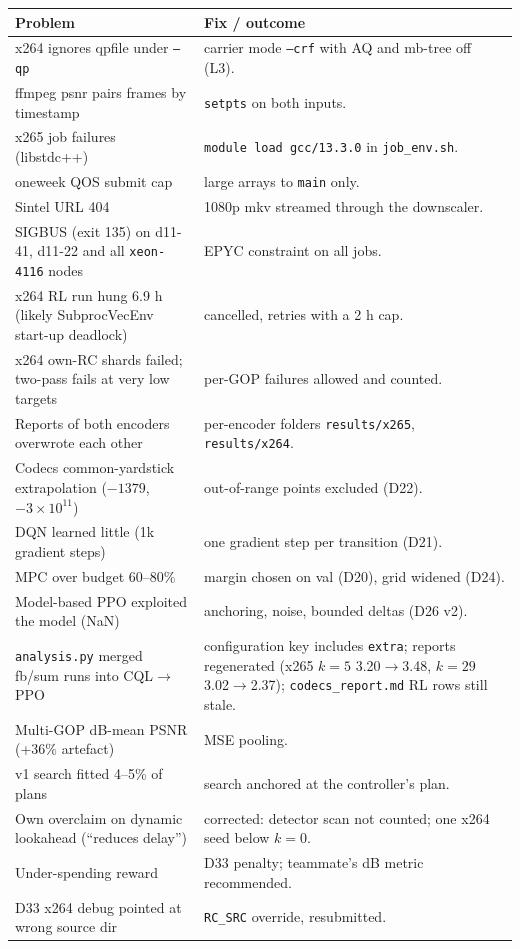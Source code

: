 \documentclass[10pt,a4paper]{article}
\newcommand{\code}[1]{\texttt{\small #1}}
\begin{document}
\begin{longtable}{p{4.2cm}p{12.2cm}}
\toprule
Problem & Fix / outcome \\\midrule
x264 ignores qpfile under \code{--qp} & carrier mode \code{--crf} with AQ and mb-tree off (L3). \\
ffmpeg psnr pairs frames by timestamp & \code{setpts} on both inputs. \\
x265 job failures (libstdc++) & \code{module load gcc/13.3.0} in \code{job\_env.sh}. \\
oneweek QOS submit cap & large arrays to \code{main} only. \\
Sintel URL 404 & 1080p mkv streamed through the downscaler. \\
SIGBUS (exit 135) on d11-41, d11-22 and all \code{xeon-4116} nodes & EPYC constraint on all jobs. \\
x264 RL run hung 6.9 h (likely SubprocVecEnv start-up deadlock) & cancelled, retries with a 2 h cap. \\
x264 own-RC shards failed; two-pass fails at very low targets & per-GOP failures allowed and counted. \\
Reports of both encoders overwrote each other & per-encoder folders \code{results/x265}, \code{results/x264}. \\
Codecs common-yardstick extrapolation ($-1379$, $-3\times10^{11}$) & out-of-range points excluded (D22). \\
DQN learned little (1k gradient steps) & one gradient step per transition (D21). \\
MPC over budget 60--80\% & margin chosen on val (D20), grid widened (D24). \\
Model-based PPO exploited the model (NaN) & anchoring, noise, bounded deltas (D26 v2). \\
\code{analysis.py} merged fb/sum runs into CQL$\to$PPO & configuration key includes \code{extra}; reports regenerated
(x265 $k=5$ 3.20$\to$3.48, $k=29$ 3.02$\to$2.37); \code{codecs\_report.md} RL rows still stale. \\
Multi-GOP dB-mean PSNR (+36\% artefact) & MSE pooling. \\
v1 search fitted 4--5\% of plans & search anchored at the controller's plan. \\
Own overclaim on dynamic lookahead (``reduces delay'') & corrected: detector scan not counted; one x264 seed below $k=0$. \\
Under-spending reward & D33 penalty; teammate's dB metric recommended. \\
D33 x264 debug pointed at wrong source dir & \code{RC\_SRC} override, resubmitted. \\
\bottomrule
\end{longtable}
\end{document}
